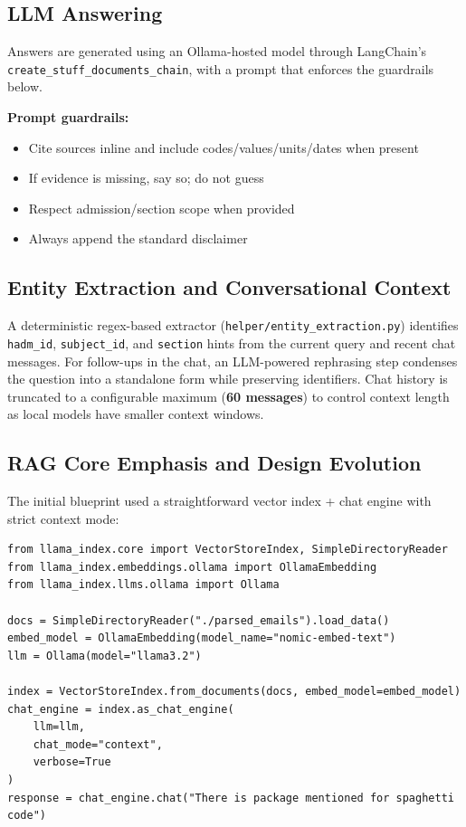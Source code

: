 \subsection{LLM Answering}
Answers are generated using an Ollama-hosted model through LangChain's \newline\texttt{create\_stuff\_documents\_chain}, with a prompt that enforces the guardrails below.

\noindent \textbf{Prompt guardrails:}
\begin{itemize}
  \item Cite sources inline and include codes/values/units/dates when present
  \item If evidence is missing, say so; do not guess
  \item Respect admission/section scope when provided
  \item Always append the standard disclaimer
\end{itemize}

\subsection{Entity Extraction and Conversational Context}
A deterministic regex-based extractor (\texttt{helper/entity\_extraction.py}) identifies \texttt{hadm\_id}, \texttt{subject\_id}, and \texttt{section} hints from the current query and recent chat messages. For follow-ups in the chat, an LLM-powered rephrasing step condenses the question into a standalone form while preserving identifiers. Chat history is truncated to a configurable maximum (\textbf{60 messages}) to control context length as local models have smaller context windows.

\subsection{RAG Core Emphasis and Design Evolution}
The initial blueprint used a straightforward vector index + chat engine with strict context mode:
\begin{verbatim}
from llama_index.core import VectorStoreIndex, SimpleDirectoryReader
from llama_index.embeddings.ollama import OllamaEmbedding
from llama_index.llms.ollama import Ollama

docs = SimpleDirectoryReader("./parsed_emails").load_data()
embed_model = OllamaEmbedding(model_name="nomic-embed-text")
llm = Ollama(model="llama3.2")

index = VectorStoreIndex.from_documents(docs, embed_model=embed_model)
chat_engine = index.as_chat_engine(
    llm=llm,
    chat_mode="context",
    verbose=True
)
response = chat_engine.chat("There is package mentioned for spaghetti code")
\end{verbatim}

